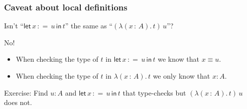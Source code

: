 \documentclass[handout,11pt,aspectratio=169]{beamer}
\newcommand{\of}{\,{:}\,} %
\newcommand{\lam}[1]{\lambda (#1).\,}
\newcommand{\letin}[3]{\mathsf{let}\,#1\,{{:}{=}}\,#2\,\mathsf{in}\,#3}
\begin{document}
\begin{frame}
  \frametitle{Caveat about local definitions}


  \begin{center}
    \Large
    Isn't ``$\letin{x}{u}{t}$'' the same as ``$(\lam{x \of A} t) \, u$''?
  \end{center}

  \pause

  \bigskip

  No!
  \begin{itemize}
  \item When checking the type of $t$ in $\letin{x}{u}{t}$ we know that $x \equiv u$.
  \item When checking the type of $t$ in $\lam{x \of A} t$ we only know that $x : A$.
  \end{itemize}
  \pause
  Exercise: Find $u : A$ and $\letin{x}{u}{t}$ that type-checks but $(\lam{x \of A} t) \, u$ does not.


\end{frame}
\end{document}
